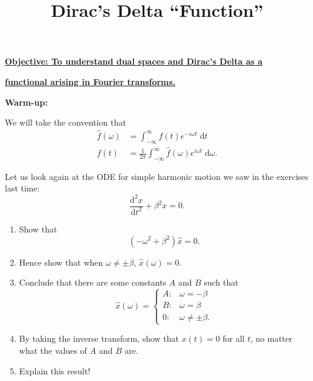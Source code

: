\documentclass{article}
\newcommand{\deriv}[3][]{\frac{\mathrm{d}^{#1}#2}{\mathrm{d}#3^{#1}}}
\newcommand{\diff}{\;\mathrm{d}}
\begin{document}
\title{Dirac's Delta ``Function''}
\date{}

\maketitle
\thispagestyle{empty}

\Large



\textbf{\underline{Objective: To understand dual spaces and Dirac's Delta as a}}

\textbf{\underline{functional arising in Fourier transforms.}}






\vspace{5mm}












\textbf{Warm-up:}

\bigskip


We will take the convention that
\begin{align*}
	\hat{f}(\omega)&=\int_{-\infty}^\infty f(t)e^{-i\omega t}\diff t\\
	f(t)&=\frac{1}{2\pi}\int_{-\infty}^\infty \hat{f}(\omega)e^{i\omega t}\diff \omega.
\end{align*}\bigskip


Let us look again at the ODE for simple harmonic motion we saw in the exercises last time:
\[\deriv[2]{x}{t} + \beta^2 x =0.\]

\begin{enumerate}
	\item Show that
		\[(-\omega^2 + \beta^2)\hat{x}=0.\]
	\item Hence show that when $\omega\neq \pm\beta$, $\hat{x}(\omega)=0$.
	\item Conclude that there are some constants $A$ and $B$ such that
		\[\hat{x}(\omega) = \begin{cases} A: & \omega =-\beta\\ B:& \omega=\beta \\ 0:& \omega\neq\pm\beta.\end{cases}\]
	\item By taking the inverse transform, show that $x(t)=0$ for all $t$, no matter what the values of $A$ and $B$ are.
	\item Explain this result!
\end{enumerate}
\end{document}
